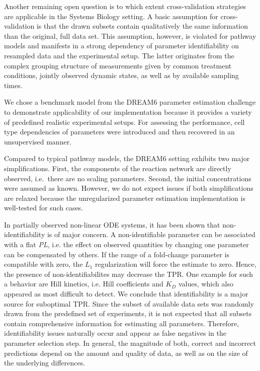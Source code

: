 \documentclass{bioinfo}
\begin{document}

Another remaining open question is to which extent cross-validation strategies are applicable in the Systems Biology setting.
A basic assumption for cross-validation is that the drawn subsets contain qualitatively the same information than the original, full data set.
This assumption, however, is violated for pathway models and manifests in a strong dependency of parameter identifiability on resampled data and the experimental setup.
The latter originates from the complex grouping structure of measurements given by common treatment conditions, jointly observed dynamic states, as well as by available sampling times.



We chose a benchmark model from the DREAM6 parameter estimation challenge 
to demonstrate applicability of our implementation because it provides a variety of predefined realistic experimental setups.
For assessing the performance, cell type dependencies of parameters were introduced and then recovered in an unsupervised manner.

Compared to typical pathway models, the DREAM6 setting exhibits two major simplifications.
First, the components of the reaction network are directly observed, i.e.~there are no scaling parameters.
Second, the initial concentrations were assumed as known.
However, we do not expect issues if both simplifications are relaxed because the unregularized parameter estimation implementation is well-tested for such cases.

In partially observed non-linear ODE systems, it has been shown that non-identifiability is of major concern.
A non-identifiable parameter can be associated with a flat \emph{PL}, i.e. the effect on observed quantities by changing one parameter can be compensated by others.
If the range of a fold-change parameter is compatible with zero, the $L_1$ regularization will force the estimate to zero.
Hence, the presence of non-identifiabilites may decrease the TPR.
One example for such a behavior are Hill kinetics, i.e. Hill coefficients and $K_D$ values, which also appeared as most difficult to detect.
We conclude that identifiability is a major source for suboptimal TPR.
Since the subset of available data sets was randomly drawn from the predefined set of experiments,
it is not expected that all subsets contain comprehensive information for estimating all parameters.
Therefore, identifiability issues naturally occur and appear as false negatives in the parameter selection step.
In general, the magnitude of both, correct and incorrect predictions depend on the amount and quality of data, as well as on the size of the underlying differences.
\end{document}
